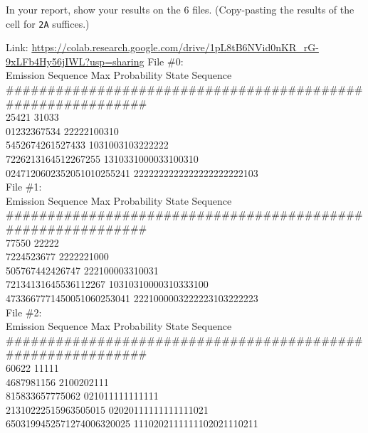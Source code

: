 In your report, show your results on the 6 files. (Copy-pasting the results of the cell for \texttt{2A} suffices.)
\begin{solution}
  Link: \url{https://colab.research.google.com/drive/1pL8tB6NVid0nKR_rG-9xLFb4Hy56jIWL?usp=sharing}
File \#0:\\
Emission Sequence             Max Probability State Sequence\\
\footnotesize\#\#\#\#\#\#\#\#\#\#\#\#\#\#\#\#\#\#\#\#\#\#\#\#\#\#\#\#\#\#\#\#\#\#\#\#\#\#\#\#\#\#\#\#\#\#\#\#\#\#\#\#\#\#\#\#\#\#\#\#\\
25421                         31033          \\               
01232367534                   22222100310    \\               
5452674261527433              1031003103222222       \\       
7226213164512267255           1310331000033100310      \\     
0247120602352051010255241     2222222222222222222222103    \\ 

File \#1:\\
Emission Sequence             Max Probability State Sequence\\
\footnotesize\#\#\#\#\#\#\#\#\#\#\#\#\#\#\#\#\#\#\#\#\#\#\#\#\#\#\#\#\#\#\#\#\#\#\#\#\#\#\#\#\#\#\#\#\#\#\#\#\#\#\#\#\#\#\#\#\#\#\#\#\\
77550                         22222      \\                   
7224523677                    2222221000 \\                   
505767442426747               222100003310031        \\       
72134131645536112267          10310310000310333100     \\     
4733667771450051060253041     2221000003222223103222223  \\   

File \#2:\\
Emission Sequence             Max Probability State Sequence\\
\footnotesize\#\#\#\#\#\#\#\#\#\#\#\#\#\#\#\#\#\#\#\#\#\#\#\#\#\#\#\#\#\#\#\#\#\#\#\#\#\#\#\#\#\#\#\#\#\#\#\#\#\#\#\#\#\#\#\#\#\#\#\#\\
60622                         11111     \\                    
4687981156                    2100202111          \\          
815833657775062               021011111111111          \\     
21310222515963505015          02020111111111111021        \\  
6503199452571274006320025     1110202111111102021110211     \\


\end{solution}

